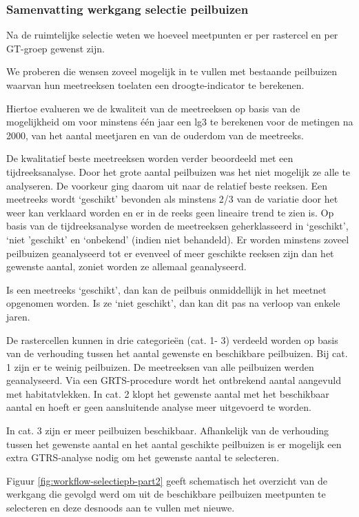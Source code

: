 \documentclass[11pt,]{book}
\begin{document}
\subsubsection{Samenvatting werkgang selectie
peilbuizen}\label{samenvatting-werkgang-selectie-peilbuizen}

Na de ruimtelijke selectie weten we hoeveel meetpunten er per rastercel
en per GT-groep gewenst zijn.

We proberen die wensen zoveel mogelijk in te vullen met bestaande
peilbuizen waarvan hun meetreeksen toelaten een droogte-indicator te
berekenen.

Hiertoe evalueren we de kwaliteit van de meetreeksen op basis van de
mogelijkheid om voor minstens één jaar een lg3 te berekenen voor de
metingen na 2000, van het aantal meetjaren en van de ouderdom van de
meetreeks.

De kwalitatief beste meetreeksen worden verder beoordeeld met een
tijdreeksanalyse. Door het grote aantal peilbuizen was het niet mogelijk
ze alle te analyseren. De voorkeur ging daarom uit naar de relatief
beste reeksen. Een meetreeks wordt `geschikt' bevonden als minstens 2/3
van de variatie door het weer kan verklaard worden en er in de reeks
geen lineaire trend te zien is. Op basis van de tijdreeksanalyse worden
de meetreeksen geherklasseerd in `geschikt', `niet 'geschikt' en
`onbekend' (indien niet behandeld). Er worden minstens zoveel peilbuizen
geanalyseerd tot er evenveel of meer geschikte reeksen zijn dan het
gewenste aantal, zoniet worden ze allemaal geanalyseerd.

Is een meetreeks `geschikt', dan kan de peilbuis onmiddellijk in het
meetnet opgenomen worden. Is ze `niet geschikt', dan kan dit pas na
verloop van enkele jaren.

De rastercellen kunnen in drie categorieën (cat. 1- 3) verdeeld worden
op basis van de verhouding tussen het aantal gewenste en beschikbare
peilbuizen. Bij cat. 1 zijn er te weinig peilbuizen. De meetreeksen van
alle peilbuizen werden geanalyseerd. Via een GRTS-procedure wordt het
ontbrekend aantal aangevuld met habitatvlekken. In cat. 2 klopt het
gewenste aantal met het beschikbaar aantal en hoeft er geen aansluitende
analyse meer uitgevoerd te worden.

In cat. 3 zijn er meer peilbuizen beschikbaar. Afhankelijk van de
verhouding tussen het gewenste aantal en het aantal geschikte peilbuizen
is er mogelijk een extra GTRS-analyse nodig om het gewenste aantal te
selecteren.

Figuur \ref{fig:workflow-selectiepb-part2} geeft schematisch het
overzicht van de werkgang die gevolgd werd om uit de beschikbare
peilbuizen meetpunten te selecteren en deze desnoods aan te vullen met
nieuwe.
\end{document}
